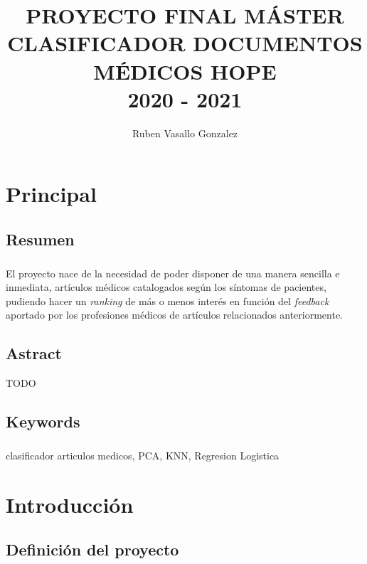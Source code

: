 \documentclass[10pt,a4paper,oneside]{book}
\author{Ruben Vasallo Gonzalez}
\title{PROYECTO FINAL MÁSTER \\ CLASIFICADOR DOCUMENTOS MÉDICOS HOPE \\ 2020 - 2021}
\begin{document}
\maketitle

\tableofcontents

\chapter{Principal}

\section{Resumen}

\paragraph{}
El proyecto nace de la necesidad de poder disponer de una manera sencilla e inmediata, artículos médicos catalogados según los síntomas de pacientes, pudiendo hacer un \textit{ranking} de más o menos interés en función del \textit{feedback} aportado por los profesiones médicos de artículos relacionados anteriormente.

\section{Astract}
TODO

\section{Keywords}

\paragraph{}
clasificador articulos medicos, PCA, KNN, Regresion Logistica

\newpage
\chapter{Introducción}

\section{Definición del proyecto}
\end{document}
